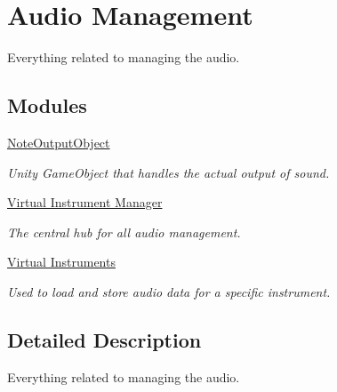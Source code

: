 \hypertarget{group___audio_management}{}\section{Audio Management}
\label{group___audio_management}


Everything related to managing the audio.  


\subsection*{Modules}
\begin{DoxyCompactItemize}
\item 
\hyperlink{group___doc_n_o_o}{Note\+Output\+Object}
\begin{DoxyCompactList}\small\item\em Unity Game\+Object that handles the actual output of sound. \end{DoxyCompactList}\item 
\hyperlink{group___v_i_m}{Virtual Instrument Manager}
\begin{DoxyCompactList}\small\item\em The central hub for all audio management. \end{DoxyCompactList}\item 
\hyperlink{group___v_i}{Virtual Instruments}
\begin{DoxyCompactList}\small\item\em Used to load and store audio data for a specific instrument. \end{DoxyCompactList}\end{DoxyCompactItemize}


\subsection{Detailed Description}
Everything related to managing the audio. 

